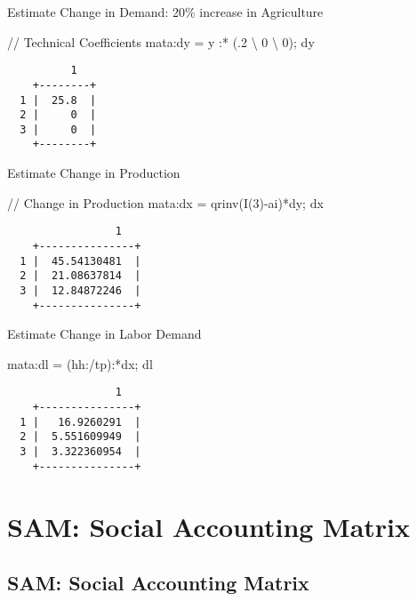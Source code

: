 \documentclass[
  letterpaper,
  DIV=11,
  numbers=noendperiod]{scrartcl}
\newenvironment{Shaded}{\begin{snugshade}}{\end{snugshade}}
\newcommand{\CommentTok}[1]{\textcolor[rgb]{0.37,0.37,0.37}{#1}}
\newcommand{\FunctionTok}[1]{\textcolor[rgb]{0.28,0.35,0.67}{#1}}
\newcommand{\KeywordTok}[1]{\textcolor[rgb]{0.00,0.23,0.31}{#1}}
\newcommand{\NormalTok}[1]{\textcolor[rgb]{0.00,0.23,0.31}{#1}}
\begin{document}
Estimate Change in Demand: 20\% increase in Agriculture

\begin{Shaded}
\begin{Highlighting}[]
\CommentTok{// Technical Coefficients}
\KeywordTok{mata}\NormalTok{:dy = }\FunctionTok{y}\NormalTok{ :* (.2 \textbackslash{} 0 \textbackslash{} 0); dy}
\end{Highlighting}
\end{Shaded}

\begin{verbatim}
          1
    +--------+
  1 |  25.8  |
  2 |     0  |
  3 |     0  |
    +--------+
\end{verbatim}

Estimate Change in Production

\begin{Shaded}
\begin{Highlighting}[]
\CommentTok{// Change in Production}
\KeywordTok{mata}\NormalTok{:dx = }\KeywordTok{qrinv}\NormalTok{(}\FunctionTok{I}\NormalTok{(3){-}ai)*dy; dx}
\end{Highlighting}
\end{Shaded}

\begin{verbatim}
                 1
    +---------------+
  1 |  45.54130481  |
  2 |  21.08637814  |
  3 |  12.84872246  |
    +---------------+
\end{verbatim}

Estimate Change in Labor Demand

\begin{Shaded}
\begin{Highlighting}[]
\KeywordTok{mata}\NormalTok{:dl = (hh:/tp)\textquotesingle{}:*dx; dl}
\end{Highlighting}
\end{Shaded}

\begin{verbatim}
                 1
    +---------------+
  1 |   16.9260291  |
  2 |  5.551609949  |
  3 |  3.322360954  |
    +---------------+
\end{verbatim}

\section{SAM: Social Accounting
Matrix}\label{sam-social-accounting-matrix}

\subsection{SAM: Social Accounting
Matrix}\label{sam-social-accounting-matrix-1}
\end{document}
